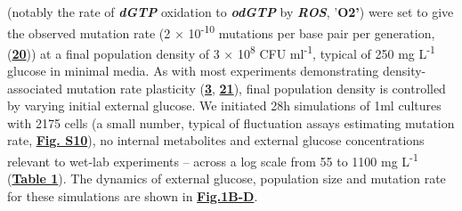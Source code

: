 \documentclass[
  12pt,
  letterpaper,
  DIV=11,
  numbers=noendperiod]{scrreprt}
\begin{document}
(notably the rate of \textbf{\emph{dGTP}} oxidation to
\textbf{\emph{odGTP}} by \textbf{\emph{ROS}}, '\textbf{O2'}) were set to
give the observed mutation rate (2 × 10\textsuperscript{-10} mutations
per base pair per generation,
(\href{https://www.biorxiv.org/content/10.1101/2023.09.27.557722v1.full\#ref-20}{\textbf{20}}))
at a final population density of 3 × 10\textsuperscript{8} CFU
ml\textsuperscript{-1}, typical of 250 mg L\textsuperscript{-1} glucose
in minimal media. As with most experiments demonstrating
density-associated mutation rate plasticity
(\href{https://www.biorxiv.org/content/10.1101/2023.09.27.557722v1.full\#ref-3}{\textbf{3}},
\href{https://www.biorxiv.org/content/10.1101/2023.09.27.557722v1.full\#ref-21}{\textbf{21}}),
final population density is controlled by varying initial external
glucose. We initiated 28h simulations of 1ml cultures with 2175 cells (a
small number, typical of fluctuation assays estimating mutation rate,
\href{https://www.biorxiv.org/content/10.1101/2023.09.27.557722v1.full\#F14}{\textbf{Fig.
S10}}), no internal metabolites and external glucose concentrations
relevant to wet-lab experiments -- across a log scale from 55 to 1100 mg
L\textsuperscript{-1}
(\href{https://www.biorxiv.org/content/10.1101/2023.09.27.557722v1.full\#T1}{\textbf{Table
1}}). The dynamics of external glucose, population size and mutation
rate for these simulations are shown in
\href{https://www.biorxiv.org/content/10.1101/2023.09.27.557722v1.full\#F1}{\textbf{Fig.1B-D}}.
\end{document}
